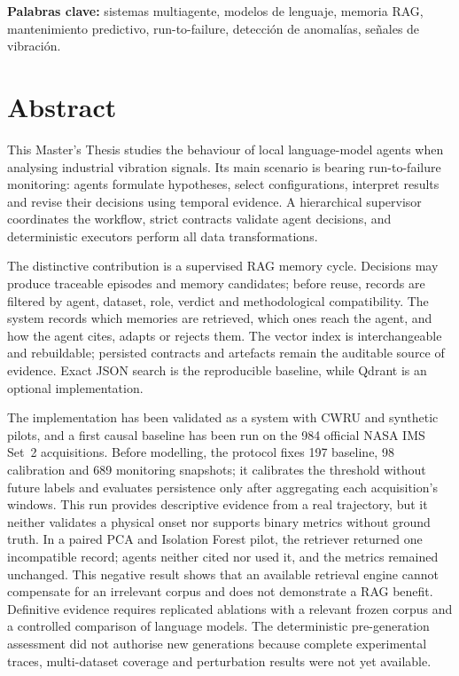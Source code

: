 \documentclass[12pt,a4paper]{report}
\begin{document}
\noindent\textbf{Palabras clave:} sistemas multiagente, modelos de lenguaje,
memoria RAG, mantenimiento predictivo, run-to-failure, detección de anomalías,
señales de vibración.

\chapter*{Abstract}
This Master's Thesis studies the behaviour of local language-model agents when
analysing industrial vibration signals. Its main scenario is bearing
run-to-failure monitoring: agents formulate hypotheses, select configurations,
interpret results and revise their decisions using temporal evidence. A
hierarchical supervisor coordinates the workflow, strict contracts validate
agent decisions, and deterministic executors perform all data transformations.

The distinctive contribution is a supervised RAG memory cycle. Decisions may
produce traceable episodes and memory candidates; before reuse, records are
filtered by agent, dataset, role, verdict and methodological compatibility. The
system records which memories are retrieved, which ones reach the agent, and
how the agent cites, adapts or rejects them. The vector index is interchangeable
and rebuildable; persisted contracts and artefacts remain the auditable source
of evidence. Exact JSON search is the reproducible baseline, while Qdrant is an
optional implementation.

The implementation has been validated as a system with CWRU and synthetic
pilots, and a first causal baseline has been run on the 984 official NASA IMS
Set~2 acquisitions. Before modelling, the protocol fixes 197 baseline, 98
calibration and 689 monitoring snapshots; it calibrates the threshold without
future labels and evaluates persistence only after aggregating each
acquisition's windows. This run provides descriptive evidence from a real
trajectory, but it neither validates a physical onset nor supports binary
metrics without ground truth. In a paired PCA and Isolation Forest pilot, the
retriever returned one incompatible record; agents neither cited nor used it,
and the metrics remained unchanged. This negative result shows that an
available retrieval engine cannot compensate for an irrelevant corpus and
does not demonstrate a RAG benefit. Definitive evidence requires replicated
ablations with a relevant frozen corpus and a controlled comparison of language
models. The deterministic pre-generation assessment did not authorise new
generations because complete experimental traces, multi-dataset coverage and
perturbation results were not yet available.
\end{document}
